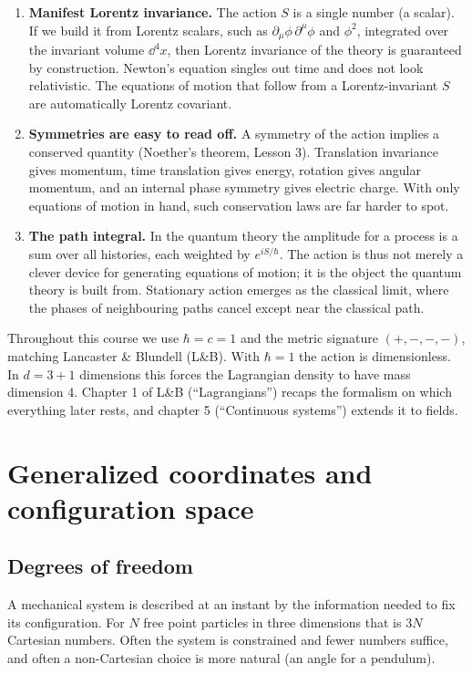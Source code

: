 \documentclass[11pt]{article}
\begin{document}
\begin{enumerate}
  \item \textbf{Manifest Lorentz invariance.} The action $S$ is a single number (a scalar). If we build it from Lorentz scalars, such as $\partial_\mu\phi\,\partial^\mu\phi$ and $\phi^2$, integrated over the invariant volume $\dd^4x$, then Lorentz invariance of the theory is guaranteed by construction. Newton's equation singles out time and does not look relativistic. The equations of motion that follow from a Lorentz-invariant $S$ are automatically Lorentz covariant.
  \item \textbf{Symmetries are easy to read off.} A symmetry of the action implies a conserved quantity (Noether's theorem, Lesson 3). Translation invariance gives momentum, time translation gives energy, rotation gives angular momentum, and an internal phase symmetry gives electric charge. With only equations of motion in hand, such conservation laws are far harder to spot.
  \item \textbf{The path integral.} In the quantum theory the amplitude for a process is a sum over all histories, each weighted by $e^{iS/\hbar}$. The action is thus not merely a clever device for generating equations of motion; it is the object the quantum theory is built from. Stationary action emerges as the classical limit, where the phases of neighbouring paths cancel except near the classical path.
\end{enumerate}

\begin{qftbridge}
Throughout this course we use $\hbar=c=1$ and the metric signature $(+,-,-,-)$, matching Lancaster \& Blundell (L\&B). With $\hbar=1$ the action is dimensionless. In $d=3+1$ dimensions this forces the Lagrangian density to have mass dimension 4. Chapter 1 of L\&B (``Lagrangians'') recaps the formalism on which everything later rests, and chapter 5 (``Continuous systems'') extends it to fields.
\end{qftbridge}

\section{Generalized coordinates and configuration space}

\subsection{Degrees of freedom}

A mechanical system is described at an instant by the information needed to fix its configuration. For $N$ free point particles in three dimensions that is $3N$ Cartesian numbers. Often the system is constrained and fewer numbers suffice, and often a non-Cartesian choice is more natural (an angle for a pendulum).
\end{document}
